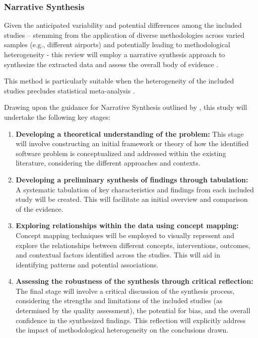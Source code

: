 \subsubsection{Narrative Synthesis}

 Given the anticipated variability and potential differences among the included studies – stemming from the application of diverse methodologies across varied samples (e.g., different airports) and potentially leading to methodological heterogeneity - this review will employ a narrative synthesis approach to synthesize the extracted data and assess the overall body of evidence \cite{campbell2018improving, campbell2019lack}. 
 
 This method is particularly suitable when the heterogeneity of the included studies precludes statistical meta-analysis \cite{popay2006guidance, campbell2018improving, campbell2019lack}. 
 
 Drawing upon the guidance for Narrative Synthesis outlined by , this study will undertake the following key stages: 
 \begin{enumerate}
     \item \textbf{Developing a theoretical understanding of the problem:} This stage will involve constructing an initial framework or theory of how the identified software problem is conceptualized and addressed within the existing literature, considering the different approaches and contexts. 
     \item \textbf{Developing a preliminary synthesis of findings through tabulation:} A systematic tabulation of key characteristics and findings from each included study will be created. This will facilitate an initial overview and comparison of the evidence.
     \item \textbf{Exploring relationships within the data using concept mapping:} Concept mapping techniques will be employed to visually represent and explore the relationships between different concepts, interventions, outcomes, and contextual factors identified across the studies. This will aid in identifying patterns and potential associations. 
     \item \textbf{Assessing the robustness of the synthesis through critical reflection:} The final stage will involve a critical discussion of the synthesis process, considering the strengths and limitations of the included studies (as determined by the quality assessment), the potential for bias, and the overall confidence in the synthesized findings. This reflection will explicitly address the impact of methodological heterogeneity on the conclusions drawn.
 \end{enumerate}

